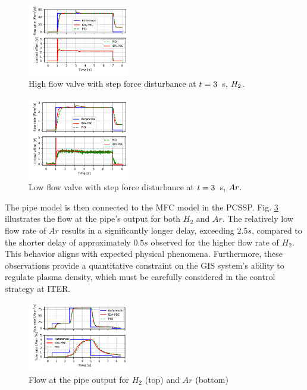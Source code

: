 \documentclass[letterpaper, 10pt, conference]{ieeeconf}
\begin{document}
\begin{figure}[!ht]
    \centering
    \includegraphics[width=0.4\textwidth]{flow_steps_H2_F.pdf}
    \caption{High flow valve with step force disturbance at \protect$t=3\protect$~\unit{s}, \protect$H_2\protect$.}
    \label{fig:ctrldist_H2}
\end{figure}
\begin{figure}[!ht]
    \centering
    \includegraphics[width=0.4\textwidth]{flow_steps_Ar_F.pdf}
    \caption{Low flow valve with step force disturbance at \protect$t=3\protect$~\unit{s}, \protect$Ar\protect$.}
    \label{fig:ctrldist_Ar}
\end{figure}

The pipe model is then connected to the MFC model in the PCSSP. Fig. \ref{fig:ctrlstep_pipeout} illustrates the flow at the pipe's output for both $H_2$ and $Ar$. The relatively low flow rate of $Ar$ results in a significantly longer delay, exceeding $2.5s$, compared to the shorter delay of approximately $0.5s$ observed for the higher flow rate of $H_2$. This behavior aligns with expected physical phenomena. Furthermore, these observations provide a quantitative constraint on the GIS system's ability to regulate plasma density, which must be carefully considered in the control strategy at ITER.

\begin{figure}[!ht]
    \centering
    \includegraphics[width=0.4\textwidth]{flow_out}
    \caption{Flow at the pipe output for $H_2$ (top) and $Ar$ (bottom)}
    \label{fig:ctrlstep_pipeout}
\end{figure}
\end{document}
